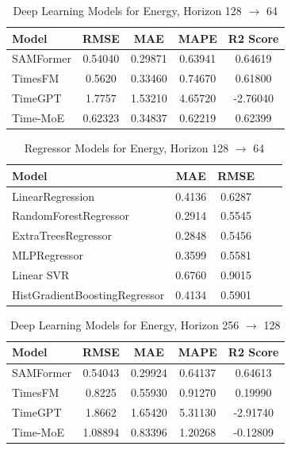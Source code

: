 \begin{table}[h!]
\centering
\begin{tabular}{lcccc}
\hline
Model & RMSE & MAE & MAPE & R2 Score \\
\hline
SAMFormer   & 0.54040 & 0.29871 & 0.63941 & 0.64619 \\
TimesFM     & 0.5620  & 0.33460 & 0.74670 & 0.61800 \\
TimeGPT     & 1.7757  & 1.53210 & 4.65720 & -2.76040 \\
Time-MoE    & 0.62323 & 0.34837 & 0.62219 & 0.62399 \\
\hline
\end{tabular}
\caption{Deep Learning Models for Energy, Horizon 128 \texorpdfstring{$\to$}{->} 64}
\label{tab:energy_128to64_dl}
\end{table}

\begin{table}[h!]
\centering
\begin{tabular}{lcccc}
\hline
Model & MAE & RMSE \\
\hline
LinearRegression              & 0.4136 & 0.6287 \\
RandomForestRegressor         & 0.2914 & 0.5545 \\
ExtraTreesRegressor           & 0.2848 & 0.5456 \\
MLPRegressor                  & 0.3599 & 0.5581 \\
Linear SVR                    & 0.6760 & 0.9015 \\
HistGradientBoostingRegressor & 0.4134 & 0.5901 \\
\hline
\end{tabular}
\caption{Regressor Models for Energy, Horizon 128 \texorpdfstring{$\to$}{->} 64}
\label{tab:energy_128to64_reg}
\end{table}

\begin{table}[h!]
\centering
\begin{tabular}{lcccc}
\hline
Model & RMSE & MAE & MAPE & R2 Score \\
\hline
SAMFormer   & 0.54043 & 0.29924 & 0.64137 & 0.64613 \\
TimesFM     & 0.8225  & 0.55930 & 0.91270 & 0.19990 \\
TimeGPT     & 1.8662  & 1.65420 & 5.31130 & -2.91740 \\
Time-MoE    & 1.08894 & 0.83396 & 1.20268 & -0.12809 \\
\hline
\end{tabular}
\caption{Deep Learning Models for Energy, Horizon 256 \texorpdfstring{$\to$}{->} 128}
\label{tab:energy_256to128_dl}
\end{table}

